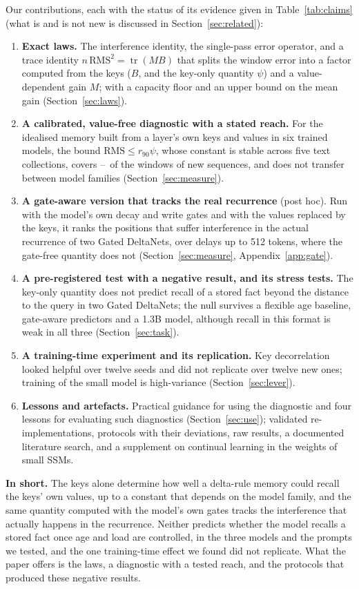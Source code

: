 \documentclass{article}
\newcommand{\tr}{\operatorname{tr}}
\begin{document}
Our contributions, each with the status of its evidence given in Table~\ref{tab:claims} (what is and is not new is discussed in Section~\ref{sec:related}):
\begin{enumerate}
  \item \textbf{Exact laws.} The interference identity, the single-pass error operator, and a trace identity $n\,\mathrm{RMS}^2=\tr(MB)$ that splits the window error into a factor computed from the keys ($B$, and the key-only quantity $\psi$) and a value-dependent gain $M$; with a capacity floor and an upper bound on the mean gain (Section~\ref{sec:laws}).
  \item \textbf{A calibrated, value-free diagnostic with a stated reach.} For the idealised memory built from a layer's own keys and values in six trained models, the bound $\mathrm{RMS}\le r_{90}\psi$, whose constant is stable across five text collections, covers \heldCovLo--\heldCovHi\ of the windows of new sequences, and does not transfer between model families (Section~\ref{sec:measure}).
  \item \textbf{A gate-aware version that tracks the real recurrence} (post hoc). Run with the model's own decay and write gates and with the values replaced by the keys, it ranks the positions that suffer interference in the actual recurrence of two Gated DeltaNets, over delays up to 512 tokens, where the gate-free quantity does not (Section~\ref{sec:measure}, Appendix~\ref{app:gate}).
  \item \textbf{A pre-registered test with a negative result, and its stress tests.} The key-only quantity does not predict recall of a stored fact beyond the distance to the query in two Gated DeltaNets; the null survives a flexible age baseline, gate-aware predictors and a 1.3B model, although recall in this format is weak in all three (Section~\ref{sec:task}).
  \item \textbf{A training-time experiment and its replication.} Key decorrelation looked helpful over twelve seeds and did not replicate over twelve new ones; training of the small model is high-variance (Section~\ref{sec:lever}).
  \item \textbf{Lessons and artefacts.} Practical guidance for using the diagnostic and four lessons for evaluating such diagnostics (Section~\ref{sec:use}); validated re-implementations, protocols with their deviations, raw results, a documented literature search, and a supplement on continual learning in the weights of small SSMs.
\end{enumerate}
\textbf{In short.} The keys alone determine how well a delta-rule memory could recall the keys' own values, up to a constant that depends on the model family, and the same quantity computed with the model's own gates tracks the interference that actually happens in the recurrence. Neither predicts whether the model recalls a stored fact once age and load are controlled, in the three models and the prompts we tested, and the one training-time effect we found did not replicate. What the paper offers is the laws, a diagnostic with a tested reach, and the protocols that produced these negative results.
\end{document}
